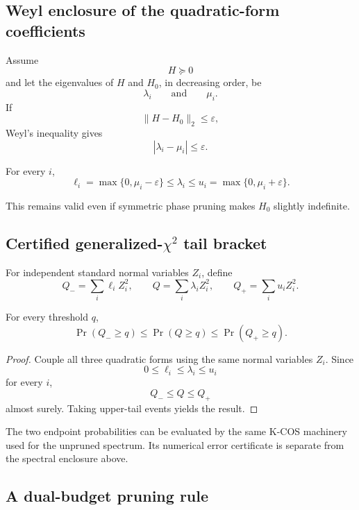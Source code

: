 \subsection{Weyl enclosure of the quadratic-form coefficients}

Assume
\[
H\succeq0
\]
and let the eigenvalues of \(H\) and \(H_0\), in decreasing order, be
\[
\lambda_i
\qquad\text{and}\qquad
\mu_i.
\]
If
\[
\|H-H_0\|_2\le\varepsilon,
\]
Weyl's inequality gives
\[
|\lambda_i-\mu_i|\le\varepsilon.
\]

\begin{corollary}\label{claim:final-22-2}
For every \(i\),
\[
\boxed{
\ell_i
=
\max\{0,\mu_i-\varepsilon\}
\le
\lambda_i
\le
u_i
=
\max\{0,\mu_i+\varepsilon\}.
}
\]
\end{corollary}

This remains valid even if symmetric phase pruning makes \(H_0\) slightly
indefinite.

\subsection{Certified generalized-\texorpdfstring{\(\chi^2\)}{chi-square} tail bracket}

For independent standard normal variables \(Z_i\), define
\[
Q_-=\sum_i\ell_iZ_i^2,
\qquad
Q=\sum_i\lambda_iZ_i^2,
\qquad
Q_+=\sum_i u_iZ_i^2.
\]

\begin{theorem}\label{claim:final-22-3}
For every threshold \(q\),
\[
\boxed{
\Pr(Q_-\ge q)
\le
\Pr(Q\ge q)
\le
\Pr(Q_+\ge q).
}
\]
\end{theorem}

\begin{proof}
Couple all three quadratic forms using the same normal variables \(Z_i\).
Since
\[
0\le\ell_i\le\lambda_i\le u_i
\]
for every \(i\),
\[
Q_-\le Q\le Q_+
\]
almost surely.  Taking upper-tail events yields the result.
\end{proof}

The two endpoint probabilities can be evaluated by the same K-COS machinery
used for the unpruned spectrum.  Its numerical error certificate is separate
from the spectral enclosure above.

\subsection{A dual-budget pruning rule}

